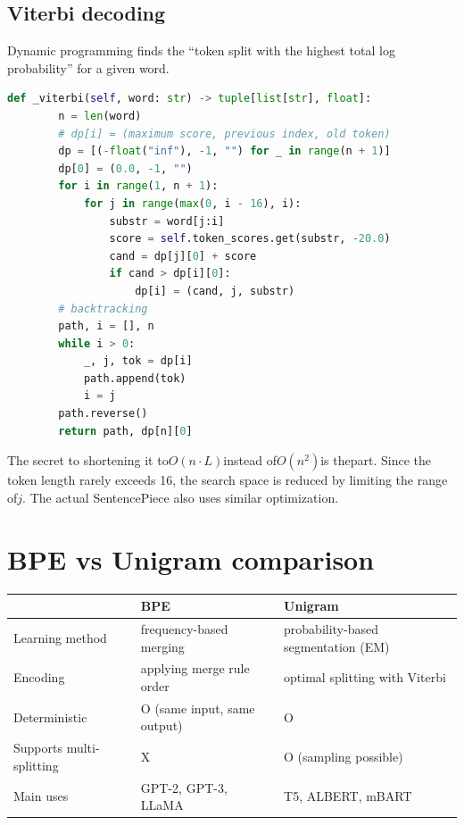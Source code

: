 \subsection{Viterbi decoding}

Dynamic programming finds the ``token split with the highest total log probability'' for a given word.

\begin{lstlisting}[language=Python]
    def _viterbi(self, word: str) -> tuple[list[str], float]:
        n = len(word)
        # dp[i] = (maximum score, previous index, old token)
        dp = [(-float("inf"), -1, "") for _ in range(n + 1)]
        dp[0] = (0.0, -1, "")
        for i in range(1, n + 1):
            for j in range(max(0, i - 16), i):
                substr = word[j:i]
                score = self.token_scores.get(substr, -20.0)
                cand = dp[j][0] + score
                if cand > dp[i][0]:
                    dp[i] = (cand, j, substr)
        # backtracking
        path, i = [], n
        while i > 0:
            _, j, tok = dp[i]
            path.append(tok)
            i = j
        path.reverse()
        return path, dp[n][0]
\end{lstlisting}

\begin{infobox}
The secret to shortening it to$O(n \cdot L)$instead of$O(n^2)$is thepart. Since the token length rarely exceeds 16, the search space is reduced by limiting the range of$j$. The actual SentencePiece also uses similar optimization.
\end{infobox}

\section{BPE vs Unigram comparison}

\begin{center}
\begin{tabularx}{\textwidth}{lXX}
\toprule
 & \textbf{BPE} & \textbf{Unigram} \\
\midrule
Learning method & frequency-based merging & probability-based segmentation (EM) \\
Encoding & applying merge rule order & optimal splitting with Viterbi \\
Deterministic & O (same input, same output) & O \\
Supports multi-splitting & X & O (sampling possible) \\
Main uses & GPT-2, GPT-3, LLaMA & T5, ALBERT, mBART \\
\bottomrule
\end{tabularx}
\end{center}

